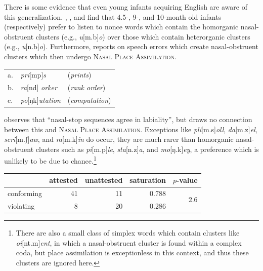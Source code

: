 There is some evidence that even young infants acquiring English are aware of this generalization. \citet{Davidson2004}, \citet{Mattys1999}, and \citet{Jusczyk2002} find that 4.5-, 9-, and 10-month old infants (respectively) prefer to listen to nonce words which contain the homorganic nasal-obstruent clusters (e.g., \emph{u}[m.b]\emph{o}) over those which contain heterorganic clusters (e.g., \emph{u}[n.b]\emph{o}). Furthermore, \citet[228]{Myers1993} reports on speech errors which create nasal-obstruent clusters which then undergo \textsc{Nasal Place Assimilation}.

\begin{example}
\begin{tabular}{l l l}
a. & \emph{pri}[mp]\emph{s}      & (\emph{prints})      \\
b. & \emph{ra}[nd] \emph{orker}  & (\emph{rank order})  \\
c. & \emph{po}[ŋk]\emph{utation} & (\emph{computation}) \\
\end{tabular}
\end{example}

\citet[175]{Pierrehumbert1994} observes that ``nasal-stop sequences agree in labiality'', but draws no connection between this and \textsc{Nasal Place Assimilation}. Exceptions like \emph{pli}[m.s]\emph{oll}, \emph{da}[m.z]\emph{el}, \emph{scri}[m.ʃ]\emph{aw}, and \emph{ra}[m.k]\emph{in} do occur, they are much rarer than homorganic nasal-obstruent clusters such as \emph{pi}[m.p]\emph{le}, \emph{sta}[n.z]\emph{a}, and \emph{mo}[ŋ.k]\emph{ey}, a preference which is unlikely to be due to chance.\footnote{There are also a small class of simplex words which contain clusters like \emph{oi}[nt.m]\emph{ent}, in which a nasal-obstruent cluster is found within a complex coda, but place assimilation is exceptionless in this context, and thus these clusters are ignored here.}

\begin{example}
\begin{tabular}{l r r r r}
\toprule
           & attested & unattested & saturation & $p$-value                   \\
\midrule
conforming & 41       & 11         & 0.788      & \multirow{2}{*}{2.6\e{-05}} \\
violating  & 8        & 20         & 0.286                                    \\
\bottomrule
\end{tabular}
\end{example}

